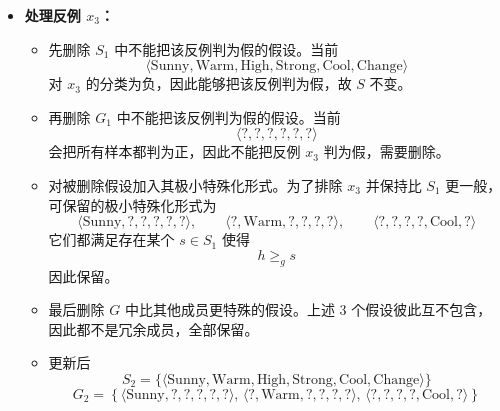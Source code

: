 \documentclass[../main.tex]{subfiles}
\begin{document}
\begin{enumerate}
{\begin{itemize}
    \item \textbf{处理反例 $x_3$：}
    \begin{itemize}
        \item 先删除 $S_1$ 中不能把该反例判为假的假设。当前
        \[
            \langle \text{Sunny}, \text{Warm}, \text{High}, \text{Strong}, \text{Cool}, \text{Change} \rangle
        \]
        对 $x_3$ 的分类为负，因此能够把该反例判为假，故 $S$ 不变。
        \item 再删除 $G_1$ 中不能把该反例判为假的假设。当前
        \[
            \langle ?, ?, ?, ?, ?, ? \rangle
        \]
        会把所有样本都判为正，因此不能把反例 $x_3$ 判为假，需要删除。
        \item 对被删除假设加入其极小特殊化形式。为了排除 $x_3$ 并保持比 $S_1$ 更一般，可保留的极小特殊化形式为
        \[
            \langle \text{Sunny}, ?, ?, ?, ?, ? \rangle,\qquad
            \langle ?, \text{Warm}, ?, ?, ?, ? \rangle,\qquad
            \langle ?, ?, ?, ?, \text{Cool}, ? \rangle
        \]
        它们都满足存在某个 $s\in S_1$ 使得
        \[
            h \geq_g s
        \]
        因此保留。
        \item 最后删除 $G$ 中比其他成员更特殊的假设。上述 3 个假设彼此互不包含，因此都不是冗余成员，全部保留。
        \item 更新后
        \[
            S_2=\{\langle \text{Sunny}, \text{Warm}, \text{High}, \text{Strong}, \text{Cool}, \text{Change} \rangle\}
        \]
        \[
            G_2=
            \left\{
            \langle \text{Sunny}, ?, ?, ?, ?, ? \rangle,\,
            \langle ?, \text{Warm}, ?, ?, ?, ? \rangle,\,
            \langle ?, ?, ?, ?, \text{Cool}, ? \rangle
            \right\}
        \]
    \end{itemize}


\end{itemize}}
\end{enumerate}
\end{document}
